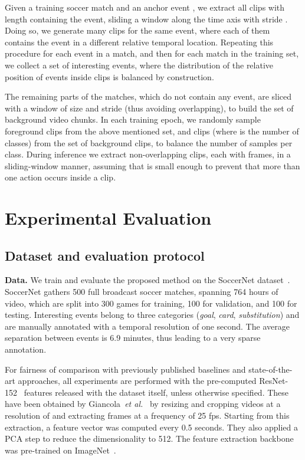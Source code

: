 \documentclass[a4paper,conference]{IEEEtran}
\newcommand{\tit}[1]{\smallbreak\noindent\textbf{#1.}}
\def \etal {\emph{et al.}}
\begin{document}
Given a training soccer match and an anchor event , we extract all clips with length  containing the event, sliding a window along the time axis with stride . Doing so, we generate many clips for the same event, where each of them contains the event in a different relative temporal location. Repeating this procedure for each event in a match, and then for each match in the training set, we collect a set of interesting events, where the distribution of the relative position of events inside clips is balanced by construction.

The remaining parts of the matches, which do not contain any event, are sliced with a window of size  and stride  (thus avoiding overlapping), to build the set of background video chunks.
In each training epoch, we randomly sample  foreground clips from the above mentioned set, and  clips (where  is the number of classes) from the set of background clips, to balance the number of samples per class. During inference we extract non-overlapping clips, each with  frames, in a sliding-window manner, assuming that  is small enough to prevent that more than one action occurs inside a clip.

\section{Experimental Evaluation}
\label{sec:experiments}

\subsection{Dataset and evaluation protocol}
\tit{Data}
We train and evaluate the proposed method on the SoccerNet dataset~\cite{giancola2018soccernet}. SoccerNet gathers 500 full broadcast soccer matches, spanning 764 hours of video, which are split into 300 games for training, 100 for validation, and 100 for testing. Interesting events belong to three categories (\textit{goal}, \textit{card}, \textit{substitution}) and are manually annotated with a temporal resolution of one second. The average separation between events is 6.9 minutes, thus leading to a very sparse annotation. 

For fairness of comparison with previously published baselines and state-of-the-art approaches, all experiments are performed with the pre-computed ResNet-152~\cite{he2016deep} features released with the dataset itself, unless otherwise specified. These have been obtained by Giancola~\etal~\cite{giancola2018soccernet} by resizing and cropping videos at a resolution of  and extracting frames at a frequency of 25 fps. Starting from this extraction, a feature vector was computed every 0.5 seconds. They also applied a PCA step to reduce the dimensionality to 512. The feature extraction backbone was pre-trained on ImageNet~\cite{deng2009imagenet}.
\end{document}
